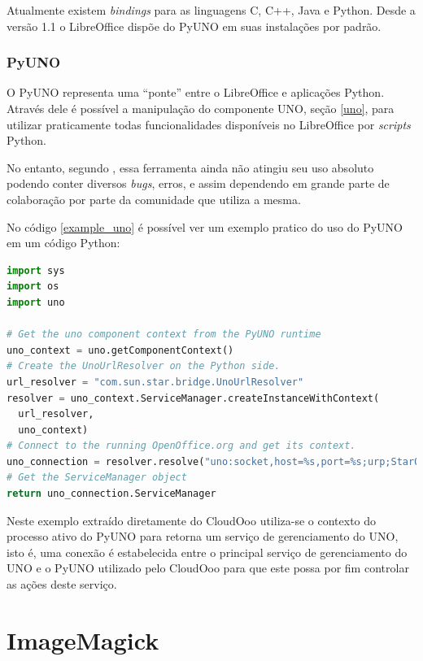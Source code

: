 Atualmente existem \textit{bindings} para as linguagens C, C++, Java e Python. Desde a versão 1.1 o LibreOffice dispõe do PyUNO em suas instalações por padrão.

\subsubsection{PyUNO}
\label{pyuno}

O PyUNO representa uma ``ponte'' entre o LibreOffice e aplicações Python. Através dele é possível a manipulação do componente UNO, seção \ref{uno}, para utilizar praticamente todas funcionalidades disponíveis no LibreOffice por \textit{scripts} Python.

No entanto, segundo , essa ferramenta ainda não atingiu seu uso absoluto podendo conter diversos \textit{bugs}, erros, e assim dependendo em grande parte de colaboração por parte da comunidade que utiliza a mesma.

No código \ref{example_uno} é possível ver um exemplo pratico do uso do PyUNO em um código Python:

{\singlespace
\begin{lstlisting}[caption=Exemplo de uso do Uno,language=python,label={example_uno}]
import sys
import os
import uno

# Get the uno component context from the PyUNO runtime
uno_context = uno.getComponentContext()
# Create the UnoUrlResolver on the Python side.
url_resolver = "com.sun.star.bridge.UnoUrlResolver"
resolver = uno_context.ServiceManager.createInstanceWithContext(
  url_resolver,
  uno_context)
# Connect to the running OpenOffice.org and get its context.
uno_connection = resolver.resolve("uno:socket,host=%s,port=%s;urp;StarOffice.ComponentContext" % (host, port))
# Get the ServiceManager object
return uno_connection.ServiceManager
\end{lstlisting}
}

Neste exemplo extraído diretamente do CloudOoo utiliza-se o contexto do processo ativo do PyUNO para retorna um serviço de gerenciamento do UNO, isto é, uma conexão é estabelecida entre o principal serviço de gerenciamento do UNO e o PyUNO utilizado pelo CloudOoo para que este possa por fim controlar as ações deste serviço.


\section{ImageMagick}
\label{imagemagick}

